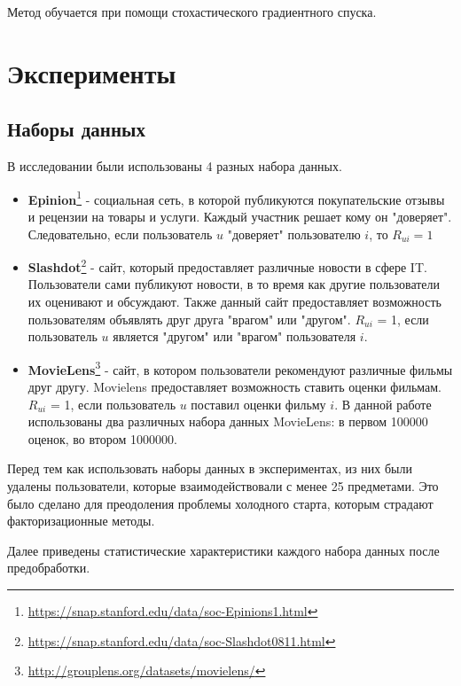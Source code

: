 \documentclass[14pt]{extarticle}
\begin{document}
Метод обучается при помощи стохастического градиентного спуска.


\section{Эксперименты}

\subsection{Наборы данных}
В исследовании были использованы 4 разных набора данных.

\begin{itemize}
\item \textbf{Epinion}\footnote{\url{https://snap.stanford.edu/data/soc-Epinions1.html}} - социальная сеть, в которой публикуются покупательские отзывы и рецензии на товары и услуги. Каждый участник  решает кому он "доверяет". Следовательно, если пользователь $u$ "доверяет" пользователю $i$, то $R_{ui} = 1$

\item \textbf{Slashdot}\footnote{\url{https://snap.stanford.edu/data/soc-Slashdot0811.html}} - сайт, который предоставляет различные новости в сфере IT. Пользователи сами публикуют новости, в то время как другие пользователи их оценивают и обсуждают. Также данный сайт предоставляет возможность пользователям объявлять друг друга "врагом" или "другом".  $R_{ui}$ = 1, если пользователь $u$ является "другом" или "врагом" пользователя $i$.

\item \textbf{MovieLens}\footnote{\url{http://grouplens.org/datasets/movielens/}} - сайт, в котором пользователи рекомендуют различные фильмы друг другу. Movielens предоставляет возможность ставить оценки фильмам. $R_{ui}$ = 1, если пользователь $u$ поставил оценки фильму $i$. В данной работе использованы два различных набора данных MovieLens: в первом 100000 оценок, во втором 1000000.

\end{itemize}

Перед тем как использовать наборы данных в экспериментах, из них были удалены пользователи, которые взаимодействовали с менее  25 предметами. Это было сделано для преодоления проблемы холодного старта, которым страдают факторизационные методы. 

Далее приведены статистические характеристики каждого набора данных после предобработки. 
\end{document}
